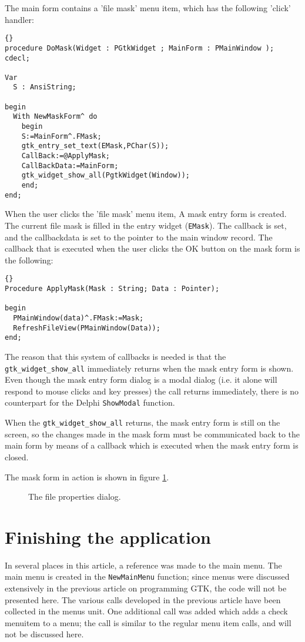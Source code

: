 \documentclass[10pt]{article}
\newcommand{\file}[1]{\textsf{#1}}
\begin{document}
The main form contains a 'file mask' menu item, which has the following
'click' handler:
\begin{lstlisting}{}
procedure DoMask(Widget : PGtkWidget ; MainForm : PMainWindow ); cdecl;
 
Var
  S : AnsiString;
 
begin
  With NewMaskForm^ do
    begin
    S:=MainForm^.FMask;
    gtk_entry_set_text(EMask,PChar(S));
    CallBack:=@ApplyMask;
    CallBackData:=MainForm;
    gtk_widget_show_all(PgtkWidget(Window));
    end;
end;   
\end{lstlisting}
When the user clicks the 'file mask' menu item, A mask entry form is created.
The current file mask is filled in the entry widget (\lstinline|EMask|).
The callback is set, and the callbackdata is set to the pointer to the main
window record. The callback that is executed when the user clicks the OK
button on the mask form is the following:
\begin{lstlisting}{}
Procedure ApplyMask(Mask : String; Data : Pointer);
 
begin
  PMainWindow(data)^.FMask:=Mask;
  RefreshFileView(PMainWindow(Data));
end;
\end{lstlisting} 

The reason that this system of callbacks is needed is that the
\lstinline|gtk_widget_show_all| immediately returns when the mask entry form is 
shown. Even though the mask entry form dialog is a modal dialog (i.e. it alone will
respond to mouse clicks and key presses) the call returns immediately,
there is no counterpart for the Delphi \lstinline|ShowModal| function.

When the \lstinline|gtk_widget_show_all| returns, the mask entry form is still on
the screen, so the changes made in the mask form must be communicated 
back to the main form by means of a callback which is executed when 
the mask entry form is closed.

The mask form in action is shown in figure \ref{fig:filemask}.
\begin{figure}[ht]
\begin{center}
\caption{The file properties dialog.}\label{fig:filemask}
\end{center}
\end{figure}

\section{Finishing the application}
In several places in this article, a reference was made to the main menu. 
The main menu is created in the \lstinline|NewMainMenu| function; since
menus were discussed extensively in the previous article on programming GTK,
the code will not be presented here. The various calls developed in the
previous article have been collected in the \file{menus} unit. One
additional call was added which adds a check menuitem to a menu; the call is
similar to the regular menu item calls, and will not be discussed here.
\end{document}
